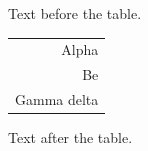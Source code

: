 \documentclass[12pt]{article}
\begin{document}
Text before the table.

\begin{tabular}{r}Alpha\\Be\\Gamma delta\end{tabular}

Text after the table.
\end{document}
